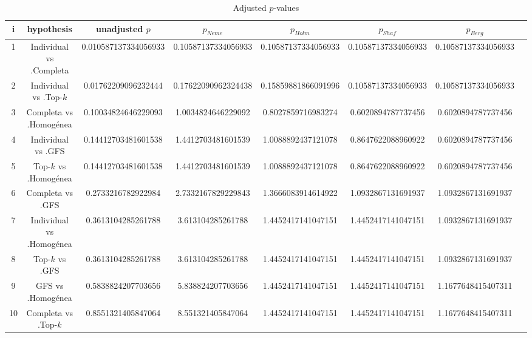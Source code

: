 \documentclass[a4paper,10pt]{article}
\begin{document}
\begin{landscape}
\begin{table}[!htp]
\centering\tiny
\caption{Adjusted $p$-values}
\begin{tabular}{cccccccc}
i&hypothesis&unadjusted $p$&$p_{Neme}$&$p_{Holm}$&$p_{Shaf}$&$p_{Berg}$\\
\hline
1&Individual vs .Completa&0.010587137334056933&0.10587137334056933&0.10587137334056933&0.10587137334056933&0.10587137334056933\\
2&Individual vs .Top-$k$&0.01762209096232444&0.17622090962324438&0.15859881866091996&0.10587137334056933&0.10587137334056933\\
3&Completa vs .Homogénea&0.10034824646229093&1.0034824646229092&0.8027859716983274&0.6020894787737456&0.6020894787737456\\
4&Individual vs .GFS&0.14412703481601538&1.4412703481601539&1.0088892437121078&0.8647622088960922&0.6020894787737456\\
5&Top-$k$ vs .Homogénea&0.14412703481601538&1.4412703481601539&1.0088892437121078&0.8647622088960922&0.6020894787737456\\
6&Completa vs .GFS&0.2733216782922984&2.7332167829229843&1.3666083914614922&1.0932867131691937&1.0932867131691937\\
7&Individual vs .Homogénea&0.3613104285261788&3.613104285261788&1.4452417141047151&1.4452417141047151&1.0932867131691937\\
8&Top-$k$ vs .GFS&0.3613104285261788&3.613104285261788&1.4452417141047151&1.4452417141047151&1.0932867131691937\\
9&GFS vs .Homogénea&0.5838824207703656&5.838824207703656&1.4452417141047151&1.4452417141047151&1.1677648415407311\\
10&Completa vs .Top-$k$&0.8551321405847064&8.551321405847064&1.4452417141047151&1.4452417141047151&1.1677648415407311\\
\hline
\end{tabular}
\end{table}

\end{landscape}
\end{document}

